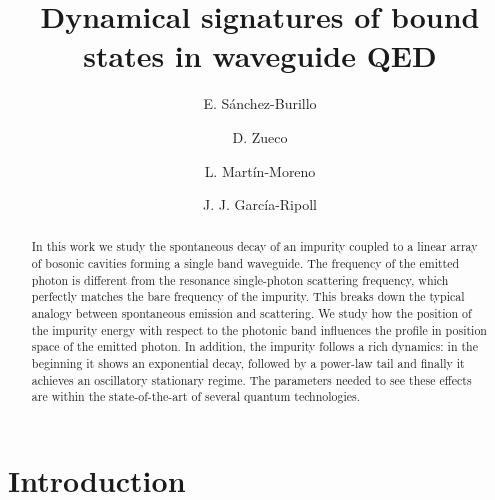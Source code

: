\documentclass[aps,pra,twocolumn,floatfix,superscriptaddress]{revtex4-1}%
\begin{document}
\title{Dynamical signatures of bound states in waveguide QED}

\author{E. S\'anchez-Burillo}
\author{D. Zueco}
\author{L. Mart\'in-Moreno}
\author{J. J. Garc\'ia-Ripoll}
\begin{abstract}
In this work we study the spontaneous decay of an impurity coupled to a linear array of bosonic cavities forming a single band waveguide. The frequency of the emitted photon is different from the resonance single-photon scattering frequency, which perfectly matches the bare frequency of the impurity. This breaks down the typical analogy between spontaneous emission and scattering. We study how the position of the impurity energy with respect to the photonic band influences the profile in position space of the emitted photon. In addition, the impurity follows a rich dynamics: in the beginning it shows an exponential decay, followed by  a power-law tail and finally it achieves an oscillatory stationary regime. The parameters needed to see these effects are within the state-of-the-art of several quantum technologies.
\end{abstract}

\maketitle

\section{Introduction}
\end{document}
